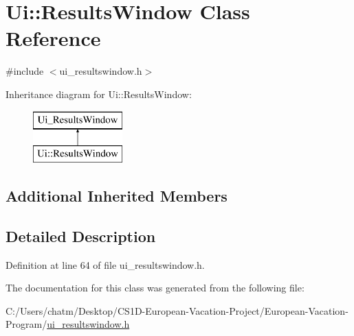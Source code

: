 \hypertarget{class_ui_1_1_results_window}{}\section{Ui\+::Results\+Window Class Reference}
\label{class_ui_1_1_results_window}


{\ttfamily \#include $<$ui\+\_\+resultswindow.\+h$>$}

Inheritance diagram for Ui\+::Results\+Window\+:\begin{figure}[H]
\begin{center}
\leavevmode
\includegraphics[height=2.000000cm]{class_ui_1_1_results_window}
\end{center}
\end{figure}
\subsection*{Additional Inherited Members}


\subsection{Detailed Description}


Definition at line 64 of file ui\+\_\+resultswindow.\+h.



The documentation for this class was generated from the following file\+:\begin{DoxyCompactItemize}
\item 
C\+:/\+Users/chatm/\+Desktop/\+C\+S1\+D-\/\+European-\/\+Vacation-\/\+Project/\+European-\/\+Vacation-\/\+Program/\mbox{\hyperlink{ui__resultswindow_8h}{ui\+\_\+resultswindow.\+h}}\end{DoxyCompactItemize}
